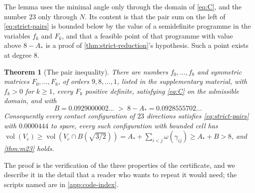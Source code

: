 \documentclass[11pt,reqno]{amsart}
\renewcommand{\_}{\origunderscore\allowbreak}
\numberwithin{equation}{section}
\theoremstyle{plain}
\newtheorem{thm}{Theorem}[section]
\theoremstyle{definition}
\theoremstyle{remark}
\DeclareMathOperator{\vol}{vol}
\begin{document}
The lemma uses the minimal angle only through the domain of
\eqref{eq:C}, and the number $23$ only through $N$. Its content is that
the pair sum on the left of \eqref{eq:strict-pairs} is bounded below by
the value of a semidefinite programme in the variables $f_k$ and $F_k$,
and that a feasible point of that programme with value above
$8-A_*$ is a proof of \cref{thm:strict-reduction}'s hypothesis. Such a
point exists at degree $8$.

\begin{thm}[The pair inequality]\label{thm:certificate}
There are numbers $f_0,\dots,f_8$ and symmetric matrices
$F_0,\dots,F_8$, of orders $9,8,\dots,1$, listed in the supplementary
material, with $f_k>0$ for $k\ge1$, every $F_k$ positive definite,
satisfying \eqref{eq:C} on the admissible domain, and with
\[
  B=0.0929000002\ldots\;>\;8-A_*=0.0928555702\ldots
\]
Consequently every contact configuration of $23$ directions satisfies
\eqref{eq:strict-pairs} with $0.0000444$ to spare, every such
configuration with bounded cell has
$\vol(V_c)\ge\vol(V_c\cap B(\sqrt{3/2}))=A_*+\sum_{i<j}\omega(\gamma_{ij})\ge A_*+B>8$,
and \cref{thm:m23} holds.
\end{thm}

The proof is the verification of the three properties of the
certificate, and we describe it in the detail that a reader who wants
to repeat it would need; the scripts named are in \cref{app:code-index}.
\end{document}

